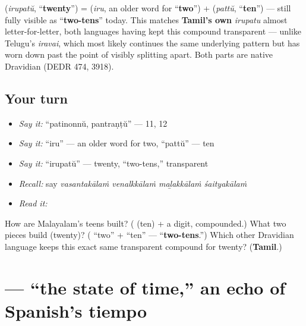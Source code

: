 \begin{cousinweb}
\textbf{} (\emph{irupatŭ}, \textquotedblleft{}\textbf{twenty}\textquotedblright{}) = \textbf{} (\emph{iru}, an older word for \textquotedblleft{}\textbf{two}\textquotedblright{}) + \textbf{} (\emph{pattŭ}, \textquotedblleft{}\textbf{ten}\textquotedblright{}) — still fully visible as \textquotedblleft{}\textbf{two-tens}\textquotedblright{} today. This matches \textbf{Tamil's own} \emph{irupatu} almost letter-for-letter, both languages having kept this compound transparent — unlike Telugu's \emph{iravai}, which most likely continues the same underlying pattern but has worn down past the point of visibly splitting apart. Both parts are native Dravidian (DEDR 474, 3918).
\end{cousinweb}

\subsection*{Your turn}
\begin{itemize}
\raggedright
  \item \emph{Say it:} \textquotedblleft{}patinonnŭ, pantraṇṭŭ\textquotedblright{} — 11, 12
  \item \emph{Say it:} \textquotedblleft{}iru\textquotedblright{} — an older word for two, \textquotedblleft{}pattŭ\textquotedblright{} — ten
  \item \emph{Say it:} \textquotedblleft{}irupatŭ\textquotedblright{} — twenty, \textquotedblleft{}two-tens,\textquotedblright{} transparent
  \item \emph{Recall:} say \emph{vasantakālaṁ venalkkālaṁ maḻakkālaṁ śaityakālaṁ}
  \item \emph{Read it:} \textbf{  }
\end{itemize}

\begin{tcolorbox}[breakable,colback=teal!4,colframe=teal!35!black,title={Before you move on}]
How are Malayalam's teens built? (\textbf{} (ten) + a digit, compounded.) What two pieces build \textbf{} (twenty)? (\textbf{} \textquotedblleft{}two\textquotedblright{} + \textbf{} \textquotedblleft{}ten\textquotedblright{} — \textquotedblleft{}\textbf{two-tens}.\textquotedblright{}) Which other Dravidian language keeps this exact same transparent compound for twenty? (\textbf{Tamil}.)
\end{tcolorbox}
\section[\texorpdfstring{\ml{കാലാവസ്ഥ} (kālāvastha)}{കാലാവസ്ഥ (kālāvastha)}]{ — \textquotedblleft{}the state of time,\textquotedblright{} an echo of Spanish's tiempo}

